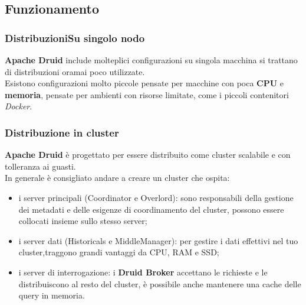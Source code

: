 \documentclass{article}
\begin{document}
\subsection{Funzionamento}
\subsubsection{DistribuzioniSu singolo nodo}
\textbf{Apache Druid} include molteplici configurazioni su singola macchina si trattano di distribuzioni oramai poco utilizzate.
\\
Esistono configurazioni molto piccole pensate per macchine con poca \textbf{CPU} e \textbf{memoria}, pensate per ambienti con risorse limitate, come i piccoli contenitori \textit{Docker}.
\subsubsection{Distribuzione in cluster}
\textbf{Apache Druid} è progettato per essere distribuito come cluster scalabile e con tolleranza ai guasti.\\
In generale è consigliato andare a creare un cluster che ospita: 
\begin{itemize}
    \item i server principali (Coordinator e Overlord): sono responsabili della gestione dei metadati e delle esigenze di coordinamento del  cluster, possono essere collocati insieme sullo stesso server;
    \item i server dati (Historicals e MiddleManager):
    per gestire i dati effettivi nel tuo cluster,traggono grandi vantaggi da CPU, RAM e SSD;
    \item i server di interrogazione:
    i \textbf{Druid Broker} accettano le richieste e le distribuiscono al resto del cluster, è possibile anche mantenere una cache delle query in memoria.
\end{itemize}
\end{document}
